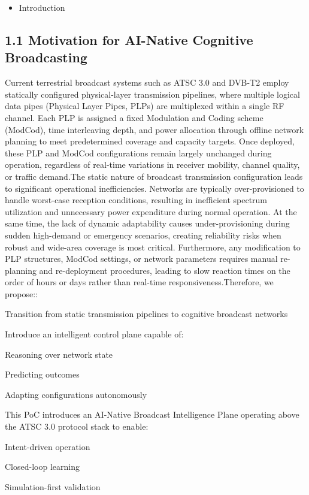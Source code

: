 \documentclass{article}
\begin{document}
\begin{itemize}
  \item Introduction
\end{itemize}
\subsection{1.1 Motivation for AI-Native Cognitive Broadcasting}
Current terrestrial broadcast systems such as ATSC 3.0 and DVB-T2 employ statically configured physical-layer transmission pipelines, where multiple logical data pipes (Physical Layer Pipes, PLPs) are multiplexed within a single RF channel. Each PLP is assigned a fixed Modulation and Coding scheme (ModCod), time interleaving depth, and power allocation through offline network planning to meet predetermined coverage and capacity targets. Once deployed, these PLP and ModCod configurations remain largely unchanged during operation, regardless of real-time variations in receiver mobility, channel quality, or traffic demand.The static nature of broadcast transmission configuration leads to significant operational inefficiencies. Networks are typically over-provisioned to handle worst-case reception conditions, resulting in inefficient spectrum utilization and unnecessary power expenditure during normal operation. At the same time, the lack of dynamic adaptability causes under-provisioning during sudden high-demand or emergency scenarios, creating reliability risks when robust and wide-area coverage is most critical. Furthermore, any modification to PLP structures, ModCod settings, or network parameters requires manual re-planning and re-deployment procedures, leading to slow reaction times on the order of hours or days rather than real-time responsiveness.Therefore, we propose::

Transition from static transmission pipelines to cognitive broadcast networks

Introduce an intelligent control plane capable of:

Reasoning over network state

Predicting outcomes

Adapting configurations autonomously

This PoC introduces an AI-Native Broadcast Intelligence Plane operating above the ATSC 3.0 protocol stack to enable:

Intent-driven operation

Closed-loop learning

Simulation-first validation
\end{document}
